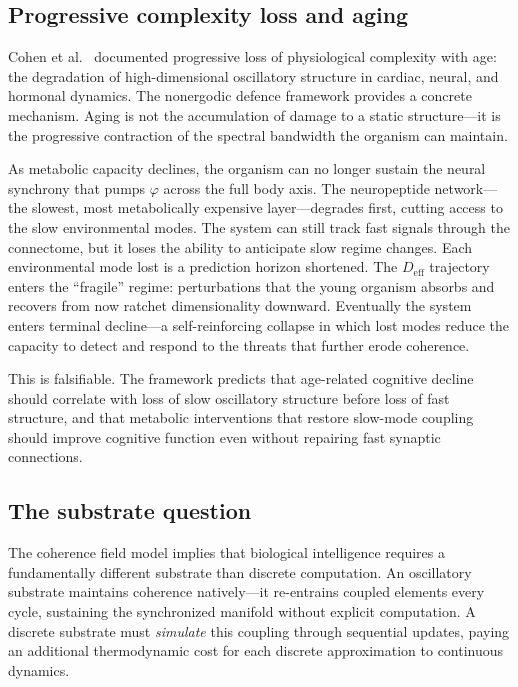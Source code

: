 \documentclass[12pt]{article}
\newcommand{\Deff}{D_{\mathrm{eff}}}
\begin{document}
\subsection{Progressive complexity loss and aging}
\label{sec:aging}

Cohen et al.\ \cite{cohen2022} documented progressive loss of physiological complexity with age: the degradation of high-dimensional oscillatory structure in cardiac, neural, and hormonal dynamics. The nonergodic defence framework provides a concrete mechanism. Aging is not the accumulation of damage to a static structure---it is the progressive contraction of the spectral bandwidth the organism can maintain.

As metabolic capacity declines, the organism can no longer sustain the neural synchrony that pumps $\varphi$ across the full body axis. The neuropeptide network---the slowest, most metabolically expensive layer---degrades first, cutting access to the slow environmental modes. The system can still track fast signals through the connectome, but it loses the ability to anticipate slow regime changes. Each environmental mode lost is a prediction horizon shortened. The $\Deff$ trajectory enters the ``fragile'' regime: perturbations that the young organism absorbs and recovers from now ratchet dimensionality downward. Eventually the system enters terminal decline---a self-reinforcing collapse in which lost modes reduce the capacity to detect and respond to the threats that further erode coherence.

This is falsifiable. The framework predicts that age-related cognitive decline should correlate with loss of slow oscillatory structure before loss of fast structure, and that metabolic interventions that restore slow-mode coupling should improve cognitive function even without repairing fast synaptic connections.

\subsection{The substrate question}
\label{sec:substrate}

The coherence field model implies that biological intelligence requires a fundamentally different substrate than discrete computation. An oscillatory substrate maintains coherence natively---it re-entrains coupled elements every cycle, sustaining the synchronized manifold without explicit computation. A discrete substrate must \textit{simulate} this coupling through sequential updates, paying an additional thermodynamic cost for each discrete approximation to continuous dynamics.
\end{document}
